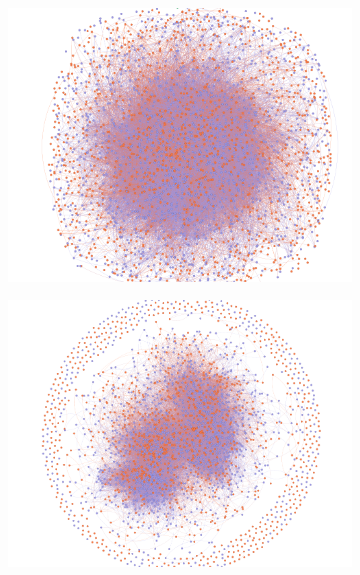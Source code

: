 \begin{figure}[H]
\centering
    \begin{subfigure}[b]{0.3\textwidth}
        \centering
        \includegraphics[width = \textwidth]{pictures/Layout_1.png}
    \end{subfigure}
    \begin{subfigure}[b]{0.3\textwidth}
        \centering
        \includegraphics[width = \textwidth]{pictures/Layout_2.png}
    \end{subfigure}
    \begin{subfigure}[b]{0.3\textwidth}
        \centering

\end{subfigure}
\end{figure}
